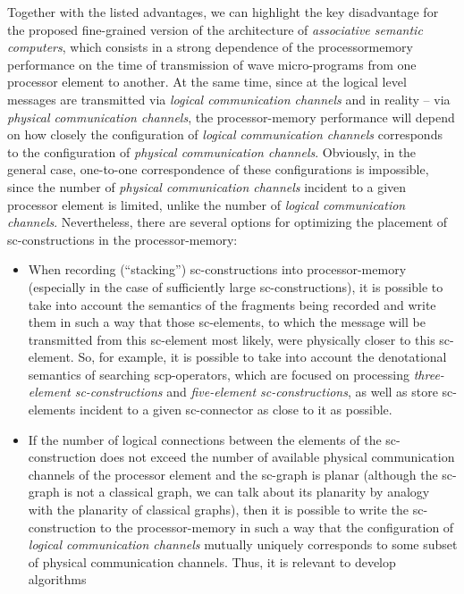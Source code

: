 \documentclass{article}
\begin{document}
\begin{multicols}{2}
	Together with the listed advantages, we can highlight the key disadvantage for the proposed fine-grained version of the architecture of \textit{associative semantic computers}, which consists in a strong dependence of the processormemory performance on the time of transmission of wave micro-programs from one processor element to another. At the same time, since at the logical level messages are transmitted via \textit{logical communication channels} and in reality – via \textit{physical communication channels}, the processor-memory performance will depend on how closely the configuration of \textit{logical communication channels} corresponds to the configuration of \textit{physical communication channels}. Obviously, in the general case, one-to-one correspondence of these configurations is impossible, since the number of \textit{physical communication channels} incident to a given processor element is limited, unlike the number of \textit{logical communication channels}. Nevertheless, there are several options for optimizing the placement of sc-constructions in the processor-memory:
	
	\begin{itemize}
		\item When recording (“stacking”) sc-constructions into processor-memory (especially in the case of sufficiently large sc-constructions), it is possible to take into account the semantics of the fragments being recorded and write them in such a way that those sc-elements, to which the message will be transmitted from this sc-element most likely, were physically closer to this sc-element. So, for example, it is possible to take into account the denotational semantics of searching scp-operators, which are focused on processing \textit{three-element sc-constructions} and \textit{five-element sc-constructions}, as well as store sc-elements incident to a given sc-connector as close to it as possible.
		
		\item If the number of logical connections between the elements of the sc-construction does not exceed the number of available physical communication channels of the processor element and the sc-graph is planar (although the sc-graph is not a classical graph, we can talk about its planarity by analogy with the planarity of classical graphs), then it is possible to write the sc-construction to the processor-memory in such a way that the configuration of \textit{logical communication channels} mutually uniquely corresponds to some subset of physical communication channels. Thus, it is relevant to develop algorithms
	\end{itemize}
	
\end{multicols}
\end{document}
